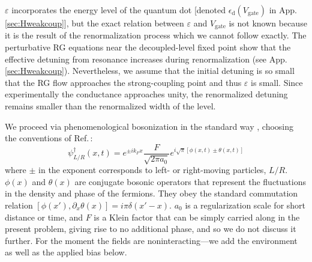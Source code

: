 \documentclass[aps,prb,reprint,floatfix,superscriptaddress,amssymb,amsmath]{revtex4-2}
\newcommand{\Vg}{V_\text{gate}}
\begin{document}
$\varepsilon$ incorporates the energy level of the quantum dot
[denoted $\epsilon_\text{d}(\Vg )$ in App.\,\ref{sec:Hweakcoup}], 
but the exact relation between $\varepsilon$ and $\Vg$ is not known because it is the result of the renormalization process which we cannot follow exactly. 
The perturbative RG equations near the decoupled-level fixed point show that the effective detuning from resonance increases during renormalization (see App.\,\ref{sec:Hweakcoup}). Nevertheless, we assume that the initial detuning is so small that the RG flow approaches the strong-coupling point and thus $\varepsilon$ is small. Since experimentally the conductance approaches unity, the renormalized detuning remains smaller than the renormalized width of the level. 

We proceed via phenomenological bosonization in the standard way \cite{GiamarchiBook,KaneFisherPRB92,GogolinBook}, choosing the conventions of Ref.\,\cite{KaneFisherPRB92}:
\begin{equation}
\psi^{\dagger}_{L/R}(x,t) =  e^{\pm i k_F x} \frac{F}{\sqrt{2\pi a_0}} 
e^{i \sqrt{\pi} [\phi(x,t) \pm \theta(x,t)]}  
\label{eq:bosonization}
\end{equation}
where $\pm$ in the exponent corresponds to left- or right-moving particles, $L/R$.
$\phi(x)$ and $\theta(x)$ are conjugate bosonic operators that represent the fluctuations in the density and phase of the fermions. They obey the standard commutation relation $[\phi(x'),\partial_x\theta(x)]=i\pi\delta(x'-x)$. 
$a_{0}$ is a regularization scale for short distance or time, and $F$ is a Klein factor that can be simply carried along in the present problem, giving rise to no additional phase, and so we do not discuss it further. 
For the moment the fields are noninteracting---we add the environment as well as the applied bias below. 
\end{document}
